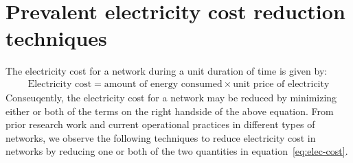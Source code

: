 \section{Prevalent electricity cost reduction techniques} %

The electricity cost for a network during a unit duration of time is given by:
\begin{align}
\text{Electricity cost} = \text{amount of energy consumed} \times \text{unit price of electricity}
\label{eq:elec-cost}
\end{align}
Conseuqently, the electricity cost for a network may be reduced by minimizing either or both of the terms on the right handside of the above equation. From prior research work and current operational practices in different types of networks, we observe the following techniques to reduce electricity cost in networks by reducing one or both of the two quantities in equation~\ref{eq:elec-cost}.

